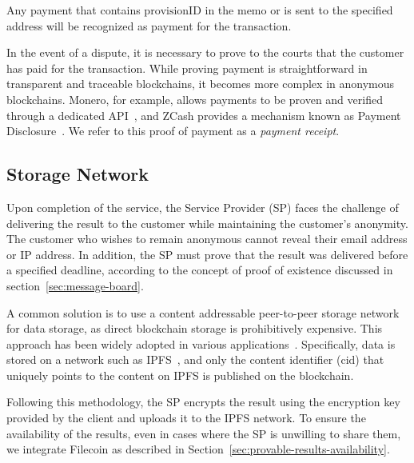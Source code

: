 \documentclass[pdftex,twocolumn,epjc3]{svjour3}
\begin{document}
Any payment that contains $\textrm{provisionID}$ in the memo or is sent to the specified address will be recognized as payment for the transaction. 


\begin{sloppypar}
In the event of a dispute, it is necessary to prove to the courts that the customer has paid for the transaction. While proving payment is straightforward in transparent and traceable blockchains, it becomes more complex in anonymous blockchains. Monero, for example, allows payments to be proven and verified through a dedicated API~\cite{moneroHowProvePayment}, and ZCash provides a mechanism known as Payment Disclosure~\cite{daviesIntroductionPaymentDisclosure2017}. We refer to this proof of payment as a \textit{payment receipt}.
\end{sloppypar}

\subsection{Storage Network}\label{storage-network}

Upon completion of the service, the Service Provider (SP) faces the challenge of delivering the result to the customer while maintaining the customer's anonymity. The customer who wishes to remain anonymous cannot reveal their email address or IP address. In addition, the SP must prove that the result was delivered before a specified deadline, according to the concept of proof of existence discussed in section~\ref{sec:message-board}.

\begin{sloppypar}
A common solution is to use a content addressable peer-to-peer storage network for data storage, as direct blockchain storage is prohibitively expensive. This approach has been widely adopted in various applications~\cite{shahidBlockchainBasedAgriFoodSupply2020, wangAuditableProtocolsFair2019, chenImprovedP2PFile2017}. Specifically, data is stored on a network such as IPFS~\cite{benetIPFSContentAddressed2014}, and only the content identifier ($\mathrm{cid}$) that uniquely points to the content on IPFS is published on the blockchain.
\end{sloppypar}

Following this methodology, the SP encrypts the result using the encryption key provided by the client and uploads it to the IPFS network. To ensure the availability of the results, even in cases where the SP is unwilling to share them, we integrate Filecoin as described in Section~\ref{sec:provable-results-availability}.
\end{document}
